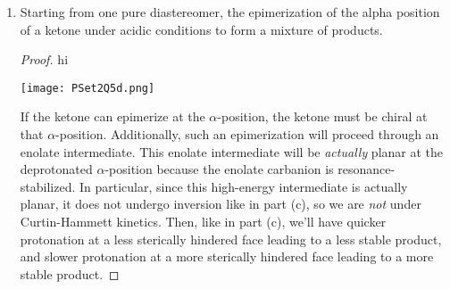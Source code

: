 \documentclass[../psets.tex]{subfiles}
\begin{document}
\begin{enumerate}
\begin{enumerate}
\begin{proof}
        \end{proof}
        \item Starting from one pure diastereomer, the epimerization of the alpha position of a ketone under acidic conditions to form a mixture of products.
        \begin{proof}
            {\color{white}hi}
            \begin{center}
                \texttt{[image: PSet2Q5d.png]}
            \end{center}
            If the ketone can epimerize at the $\alpha$-position, the ketone must be chiral at that $\alpha$-position. Additionally, such an epimerization will proceed through an enolate intermediate. This enolate intermediate will be \emph{actually} planar at the deprotonated $\alpha$-position because the enolate carbanion is resonance-stabilized. In particular, since this high-energy intermediate is actually planar, it does not undergo inversion like in part (c), so we are \emph{not} under Curtin-Hammett kinetics. Then, like in part (c), we'll have quicker protonation at a less sterically hindered face leading to a less stable product, and slower protonation at a more sterically hindered face leading to a more stable product.
        \end{proof}
    \end{enumerate}
\end{enumerate}
\end{document}
